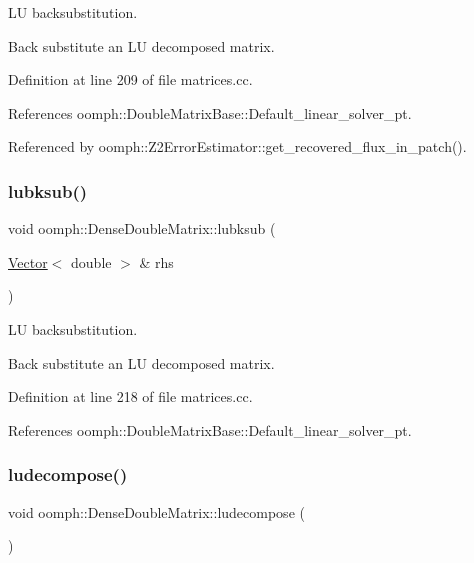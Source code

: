 LU backsubstitution. 

Back substitute an LU decomposed matrix. 

Definition at line 209 of file matrices.\+cc.



References oomph\+::\+Double\+Matrix\+Base\+::\+Default\+\_\+linear\+\_\+solver\+\_\+pt.



Referenced by oomph\+::\+Z2\+Error\+Estimator\+::get\+\_\+recovered\+\_\+flux\+\_\+in\+\_\+patch().

\mbox{\label{classoomph_1_1DenseDoubleMatrix_a0abbfbf61337d53ad1b239ba4431a47c}} 
\subsubsection{\texorpdfstring{lubksub()}{lubksub()}\hspace{0.1cm}{\footnotesize\ttfamily [2/2]}}
{\footnotesize\ttfamily void oomph\+::\+Dense\+Double\+Matrix\+::lubksub (\begin{DoxyParamCaption}\item[{\hyperlink{classoomph_1_1Vector}{Vector}$<$ double $>$ \&}]{rhs }\end{DoxyParamCaption})\hspace{0.3cm}{\ttfamily [virtual]}}



LU backsubstitution. 

Back substitute an LU decomposed matrix. 

Definition at line 218 of file matrices.\+cc.



References oomph\+::\+Double\+Matrix\+Base\+::\+Default\+\_\+linear\+\_\+solver\+\_\+pt.

\mbox{\label{classoomph_1_1DenseDoubleMatrix_a741d54dbea2a16e6e3f10bbd2d9d726e}} 
\subsubsection{\texorpdfstring{ludecompose()}{ludecompose()}}
{\footnotesize\ttfamily void oomph\+::\+Dense\+Double\+Matrix\+::ludecompose (\begin{DoxyParamCaption}{ }\end{DoxyParamCaption})\hspace{0.3cm}{\ttfamily [virtual]}}



